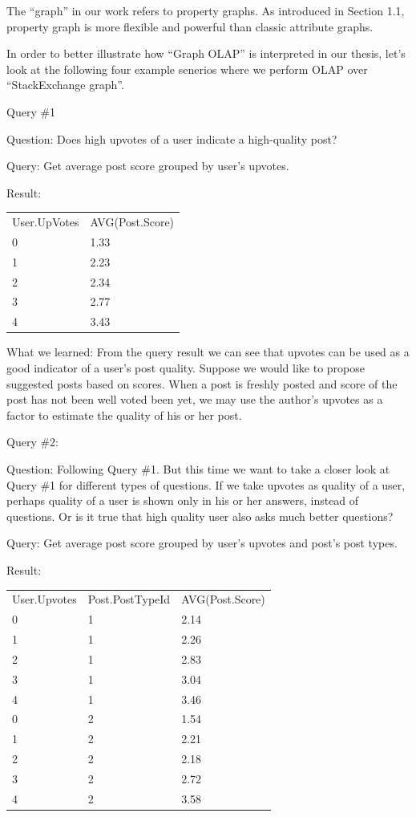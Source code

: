  The ``graph'' in our work refers to property graphs. As introduced in Section 1.1, property graph is more flexible and powerful than classic attribute graphs. 
 
 In order to better illustrate how ``Graph OLAP'' is interpreted in our thesis, let's look at the following four example senerios where we perform OLAP over ``StackExchange graph''.
 
 

Query \#1

Question: 	Does high upvotes of a user indicate a high-quality post?

Query: 		Get average post score grouped by user’s upvotes. 

Result:
\begin {center}
\begin{tabular}{ l l }  
	User.UpVotes&AVG(Post.Score)\\0&1.33\\1&2.23\\2&2.34\\3&2.77\\4&3.43\\
\end{tabular}
\end {center}



What we learned:	From the query result we can see that upvotes can be used as a good indicator of a user’s post quality. Suppose we would like to propose suggested posts based on scores. When a post is freshly posted and score of the post has not been well voted been yet, we may use the author’s upvotes as a factor to estimate the quality of his or her post.

Query \#2:

Question: 	Following  Query \#1. But this time we want to take a closer look at Query \#1 for different types of questions. If we take upvotes as quality of a user, perhaps quality of a user is shown only in his or her answers, instead of questions. Or is it true that high quality user also asks much better questions?

Query: 		Get average post score grouped by user’s upvotes and post’s post types. 

Result:

\begin {center}
\begin{tabular}{ l l l }
	User.Upvotes&Post.PostTypeId&AVG(Post.Score)\\0&1&2.14\\1&1&2.26\\2&1&2.83\\3&1&3.04\\4&1&3.46\\0&2&1.54\\1&2&2.21\\2&2&2.18\\3&2&2.72\\4&2&3.58\\
\end{tabular}
\end {center}




